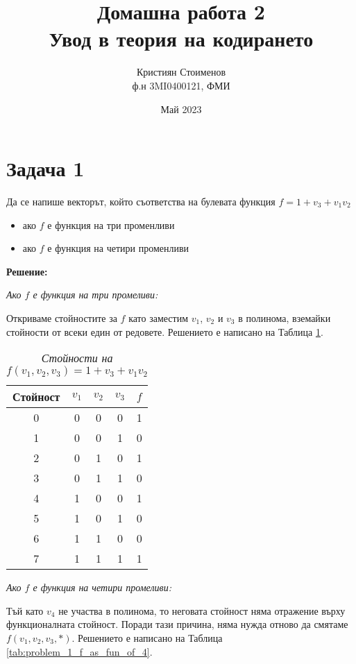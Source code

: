 \documentclass[11pt, oneside]{article}   	%
\title{Домашна работа 2 \\ {\Large Увод в теория на кодирането}}
\author{Кристиян Стоименов \\ {ф.н 3MI0400121, ФМИ}}
\date{Май 2023}
\begin{document}
\maketitle

\section*{Задача 1}
Да се напише векторът, който съответства на булевата функция $f = 1 + v_3 + v_1v_2$
\begin{itemize}
    \item ако $f$ е функция на три променливи
    \item ако $f$ е функция на четири променливи
\end{itemize}

\textbf{Решение:}

\textit{Ако $f$ е функция на три промеливи:}

Откриваме стойностите за $f$ като заместим $v_1$, $v_2$ и $v_3$ в полинома, вземайки стойности от всеки един от редовете. Решението е написано на Таблица \ref{tab:problem_1_f_as_fun_of_3}.

\begin{table}[htbp]
    \centering
    \begin{tabular}{ccccc}
        \toprule
            \textbf{Стойност} &\textbf{$v_1$} & \textbf{$v_2$} & \textbf{$v_3$} & \textbf{$f$} \\
        \midrule
            0 & 0 & 0 & 0 & 1 \\
            1 & 0 & 0 & 1 & 0 \\
            2 & 0 & 1 & 0 & 1 \\
            3 & 0 & 1 & 1 & 0 \\
            4 & 1 & 0 & 0 & 1 \\
            5 & 1 & 0 & 1 & 0 \\
            6 & 1 & 1 & 0 & 0 \\
            7 & 1 & 1 & 1 & 1 \\
        \bottomrule
    \end{tabular}
    \caption{\textit{Стойности на $f(v_1, v_2, v_3) = 1 + v_3 + v_1v_2$}}
    \label{tab:problem_1_f_as_fun_of_3}
\end{table}


\textit{Ако $f$ е функция на четири промеливи:}

Тъй като $v_4$ не участва в полинома, то неговата стойност няма отражение върху функционалната стойност. Поради тази причина, няма нужда отново да смятаме $f(v_1, v_2, v_3, *)$. Решението е написано на Таблица \ref{tab:problem_1_f_as_fun_of_4}.
\end{document}
